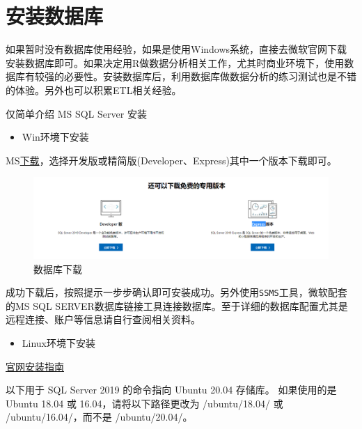 \documentclass[
]{book}
\providecommand{\tightlist}{%
  \setlength{\itemsep}{0pt}\setlength{\parskip}{0pt}}
\begin{document}
\hypertarget{ux5b89ux88c5ux6570ux636eux5e93}{%
\section{安装数据库}\label{ux5b89ux88c5ux6570ux636eux5e93}}

如果暂时没有数据库使用经验，如果是使用Windows系统，直接去微软官网下载安装数据库即可。如果决定用R做数据分析相关工作，尤其时商业环境下，使用数据库有较强的必要性。安装数据库后，利用数据库做数据分析的练习测试也是不错的体验。另外也可以积累ETL相关经验。

仅简单介绍 MS SQL Server 安装

\begin{itemize}
\tightlist
\item
  Win环境下安装
\end{itemize}

MS\href{https://www.microsoft.com/zh-cn/sql-server/sql-server-downloads}{下载}，选择开发版或精简版(Developer、Express)其中一个版本下载即可。

\begin{figure}
\centering
\includegraphics{./picture/chap2/ms install.png}
\caption{数据库下载}
\end{figure}

成功下载后，按照提示一步步确认即可安装成功。另外使用\texttt{SSMS}工具，微软配套的MS SQL SERVER数据库链接工具连接数据库。至于详细的数据库配置尤其是远程连接、账户等信息请自行查阅相关资料。

\begin{itemize}
\tightlist
\item
  Linux环境下安装
\end{itemize}

\href{https://docs.microsoft.com/zh-cn/sql/linux/sql-server-linux-setup?view=sql-server-ver15}{官网安装指南}

以下用于 SQL Server 2019 的命令指向 Ubuntu 20.04 存储库。 如果使用的是 Ubuntu 18.04 或 16.04，请将以下路径更改为 /ubuntu/18.04/ 或 /ubuntu/16.04/，而不是 /ubuntu/20.04/。
\end{document}
